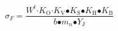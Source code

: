 \begin{equation}
{\sigma }_F\mathrm{=}\frac{W^t\mathrm{\cdot }K_{\mathrm{O}}\mathrm{\cdot }K_{\mathrm{V}}\mathrm{\bullet }K_{\mathrm{S}}\mathrm{\bullet }K_{\mathrm{H}}\mathrm{\bullet }K_{\mathrm{B}}}{b\mathrm{\bullet }m_n\mathrm{\bullet }Y_{\mathrm{J}}}
\end{equation}